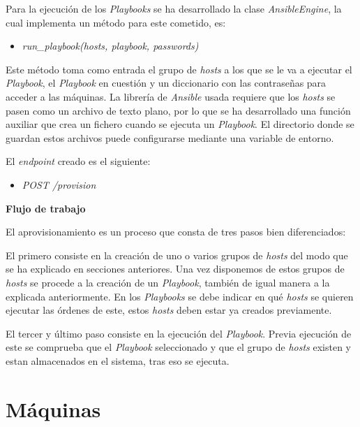 \bigskip
Para la ejecución de los \textit{Playbooks} se ha desarrollado la clase \textit{AnsibleEngine}, la cual implementa un método para este cometido, es:
\begin{itemize}
	\item \textit{run\_playbook(hosts, playbook, passwords)}
\end{itemize}

\bigskip
Este método toma como entrada el grupo de \textit{hosts} a los que se le va a ejecutar el \textit{Playbook}, el \textit{Playbook} en cuestión y un diccionario con las contraseñas para acceder a las máquinas. La librería de \textit{Ansible} usada requiere que los \textit{hosts} se pasen como un archivo de texto plano, por lo que se ha desarrollado una función auxiliar que crea un fichero cuando se ejecuta un \textit{Playbook}. El directorio donde se guardan estos archivos puede configurarse mediante una variable de entorno.



\bigskip
El \textit{endpoint} creado es el siguiente:
\begin{itemize}
	\item \textit{POST /provision}
\end{itemize}


\bigskip
\textbf{Flujo de trabajo}

El aprovisionamiento es un proceso que consta de tres pasos bien diferenciados:

El primero consiste en la creación de uno o varios grupos de \textit{hosts} del modo que se ha explicado en secciones anteriores. Una vez disponemos de estos grupos de \textit{hosts} se procede a la creación de un \textit{Playbook}, también de igual manera a la explicada anteriormente. En los \textit{Playbooks} se debe indicar en qué \textit{hosts} se quieren ejecutar las órdenes de este, estos \textit{hosts} deben estar ya creados previamente.

El tercer y último paso consiste en la ejecución del \textit{Playbook}. Previa ejecución de este se comprueba que el \textit{Playbook} seleccionado y que el grupo de \textit{hosts} existen y estan almacenados en el sistema, tras eso se ejecuta.



\section{Máquinas}

